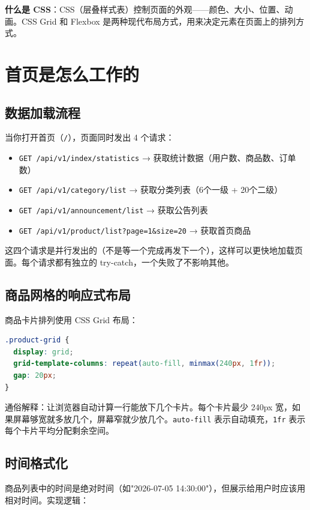 \documentclass[12pt,a4paper]{ctexart}
\begin{document}
\textbf{什么是 CSS}：CSS（层叠样式表）控制页面的外观——颜色、大小、位置、动画。CSS Grid 和 Flexbox 是两种现代布局方式，用来决定元素在页面上的排列方式。

\section{首页是怎么工作的}

\subsection{数据加载流程}

当你打开首页（\texttt{/}），页面同时发出 4 个请求：
\begin{itemize}
  \item \texttt{GET /api/v1/index/statistics} → 获取统计数据（用户数、商品数、订单数）
  \item \texttt{GET /api/v1/category/list} → 获取分类列表（6个一级 + 20个二级）
  \item \texttt{GET /api/v1/announcement/list} → 获取公告列表
  \item \texttt{GET /api/v1/product/list?page=1\&size=20} → 获取首页商品
\end{itemize}

这四个请求是并行发出的（不是等一个完成再发下一个），这样可以更快地加载页面。每个请求都有独立的 try-catch，一个失败了不影响其他。

\subsection{商品网格的响应式布局}

商品卡片排列使用 CSS Grid 布局：

\begin{lstlisting}[language=CSS]
.product-grid {
  display: grid;
  grid-template-columns: repeat(auto-fill, minmax(240px, 1fr));
  gap: 20px;
}
\end{lstlisting}

通俗解释：让浏览器自动计算一行能放下几个卡片。每个卡片最少 240px 宽，如果屏幕够宽就多放几个，屏幕窄就少放几个。\texttt{auto-fill} 表示自动填充，\texttt{1fr} 表示每个卡片平均分配剩余空间。

\subsection{时间格式化}

商品列表中的时间是绝对时间（如"2026-07-05 14:30:00"），但展示给用户时应该用相对时间。实现逻辑：
\end{document}
